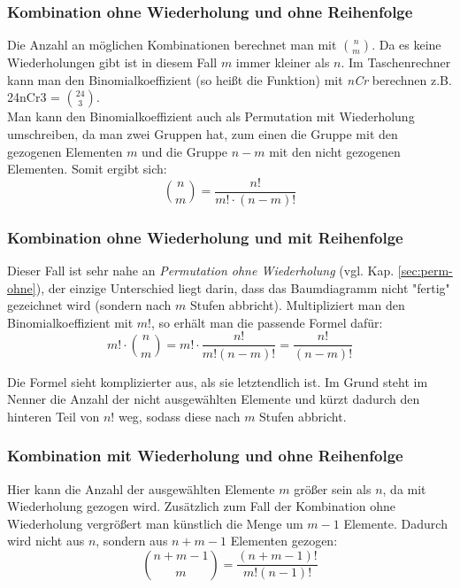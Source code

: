 \documentclass[a4paper]{article}
\newcommand\dangersign{%
 \makebox[1.8em][c]{%
 \makebox[0pt][c]{\raisebox{.15em}{\small!}}%
 \makebox[0pt][c]{\color{red}\Large$\triangle$}}}%
\begin{document}
\subsubsection{Kombination ohne Wiederholung und ohne Reihenfolge}
Die Anzahl an möglichen Kombinationen berechnet man mit $\binom{n}{m}$. Da es keine Wiederholungen gibt ist in diesem Fall $m$ immer kleiner als $n$. Im Taschenrechner kann man den Binomialkoeffizient (so heißt die Funktion) mit \textit{nCr} berechnen z.B. 24nCr3 = $\binom{24}{3}$.\\
Man kann den Binomialkoeffizient auch als Permutation mit Wiederholung umschreiben, da man zwei Gruppen hat, zum einen die Gruppe mit den gezogenen Elementen $m$ und die Gruppe $n-m$  mit den nicht gezogenen Elementen. Somit ergibt sich: $$\binom{n}{m}=\frac{n!}{m!\cdot(n-m)!}$$

\noindent {}

\subsubsection{Kombination ohne Wiederholung und mit Reihenfolge}
Dieser Fall ist sehr nahe an \textit{Permutation ohne Wiederholung} (vgl. Kap. \ref{sec:perm-ohne}), der einzige Unterschied liegt darin, dass das Baumdiagramm nicht "fertig" gezeichnet wird (sondern nach $m$ Stufen abbricht). Multipliziert man den Binomialkoeffizient mit $m!$, so erhält man die passende Formel dafür: 
$$m! \cdot \binom{n}{m} = m! \cdot \frac{n!}{m!(n-m)!} = \frac{n!}{(n-m)!}$$ 

\noindent \dangersign Die Formel sieht komplizierter aus, als sie letztendlich ist. Im Grund steht im Nenner die Anzahl der nicht ausgewählten Elemente und kürzt dadurch den hinteren Teil von $n!$ weg, sodass diese nach $m$ Stufen abbricht.

\subsubsection{Kombination mit Wiederholung und ohne Reihenfolge}
Hier kann die Anzahl der ausgewählten Elemente $m$ größer sein als $n$, da mit Wiederholung gezogen wird. Zusätzlich zum Fall der Kombination ohne Wiederholung vergrößert man künstlich die Menge um $m-1$ Elemente. Dadurch wird nicht aus $n$, sondern aus $n+m-1$ Elementen gezogen:
$$\binom{n+m-1}{m}=\frac{(n+m-1)!}{m!(n-1)!}$$
\end{document}

